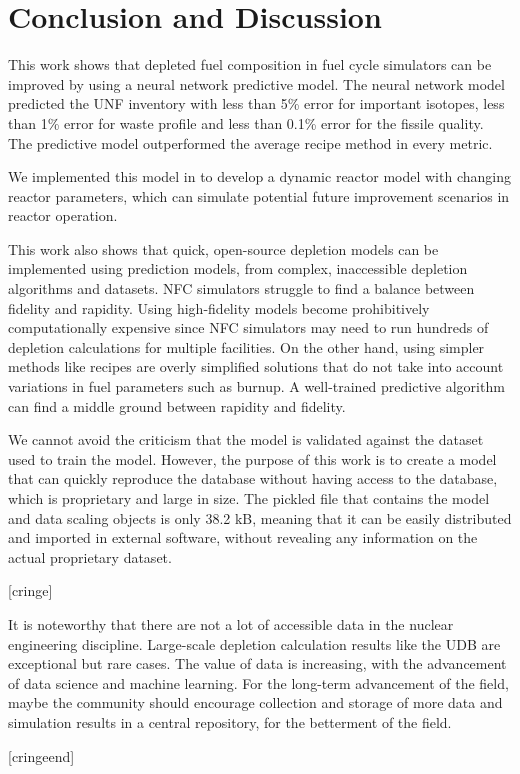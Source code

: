 \section{Conclusion and Discussion}

This work shows that depleted fuel composition
in fuel cycle simulators can be improved
by using a neural network predictive model.
The neural network model predicted the \gls{UNF} inventory
with less than 5\% error for important isotopes,
less than 1\% error for waste profile 
and less than 0.1\% error for the fissile quality.
The predictive model outperformed the average recipe
method in every metric.

We implemented this model in \Cyclus to develop a
dynamic reactor model with changing reactor parameters,
which can simulate potential future improvement scenarios
in reactor operation.

This work also shows that quick, open-source depletion models
can be implemented using prediction models, from
complex, inaccessible depletion algorithms and
datasets. \gls{NFC} simulators struggle to find a balance
between fidelity and rapidity. Using high-fidelity
models become prohibitively computationally expensive
since \gls{NFC} simulators may need to run
hundreds of depletion calculations for multiple
facilities. On the other hand, using simpler methods
like recipes are overly simplified solutions
that do not take into account variations in fuel
parameters such as burnup.
A well-trained predictive algorithm can find a middle
ground between rapidity and fidelity.

We cannot avoid the criticism that the model is validated
against the dataset used to train the model. However, the purpose
of this work is to create a model that can quickly reproduce the
database without having access to the database, which is proprietary
and large in size. The pickled file that contains
the model and data scaling objects is only 38.2 kB, meaning that it
can be easily distributed and imported in external software, without
revealing any information on the actual proprietary dataset.

[cringe]

It is noteworthy that there are not a lot of accessible data in the
nuclear engineering discipline. Large-scale depletion
calculation results like the \gls{UDB} are exceptional
but rare cases. The value of data is increasing,
with the advancement of data science and machine learning.
For the long-term advancement of the field, maybe the
community should encourage collection and storage of more
data and simulation results in
a central repository, for the betterment of the field.

[cringeend]

